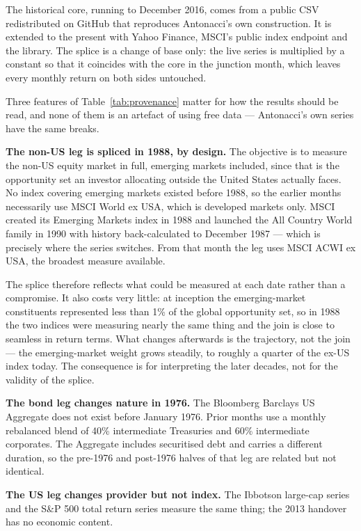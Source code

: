 \documentclass[11pt,a4paper]{article}
\begin{document}
The historical core, running to December 2016, comes from a public CSV
redistributed on GitHub that reproduces Antonacci's own construction. It is
extended to the present with Yahoo Finance, MSCI's public index endpoint and
the \citet{frenchdata} library. The splice is a change of base only: the live
series is multiplied by a constant so that it coincides with the core in the
junction month, which leaves every monthly return on both sides untouched.

Three features of Table~\ref{tab:provenance} matter for how the results should
be read, and none of them is an artefact of using free data --- Antonacci's own
series have the same breaks.

\textbf{The non-US leg is spliced in 1988, by design.} The objective is to
measure the non-US equity market in full, emerging markets included, since that
is the opportunity set an investor allocating outside the United States
actually faces. No index covering emerging markets existed before 1988, so the
earlier months necessarily use MSCI World ex USA, which is developed markets
only. MSCI created its Emerging Markets index in 1988 and launched the All
Country World family in 1990 with history back-calculated to December 1987 ---
which is precisely where the series switches. From that month the leg uses MSCI
ACWI ex USA, the broadest measure available.

The splice therefore reflects what could be measured at each date rather than a
compromise. It also costs very little: at inception the emerging-market
constituents represented less than 1\% of the global opportunity set, so in
1988 the two indices were measuring nearly the same thing and the join is
close to seamless in return terms. What changes afterwards is the trajectory,
not the join --- the emerging-market weight grows steadily, to roughly a
quarter of the ex-US index today. The consequence is for interpreting the later
decades, not for the validity of the splice.

\textbf{The bond leg changes nature in 1976.} The Bloomberg Barclays US
Aggregate does not exist before January 1976. Prior months use a monthly
rebalanced blend of 40\% intermediate Treasuries and 60\% intermediate
corporates. The Aggregate includes securitised debt and carries a different
duration, so the pre-1976 and post-1976 halves of that leg are related but not
identical.

\textbf{The US leg changes provider but not index.} The Ibbotson large-cap
series and the S\&P 500 total return series measure the same thing; the 2013
handover has no economic content.
\end{document}
